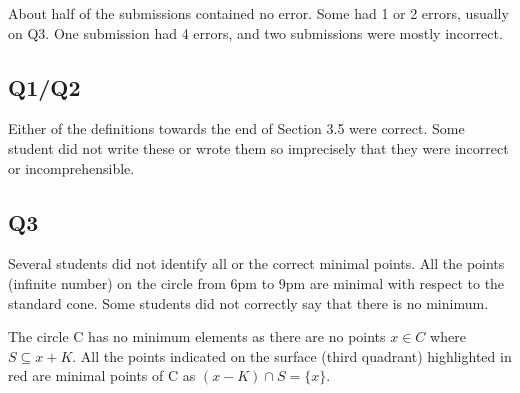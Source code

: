 About half of the submissions contained no error. Some had 1 or 2 errors, usually on Q3. One submission had 4 errors, and two submissions were mostly incorrect.

\subsection*{Q1/Q2} 

Either of the definitions towards the end of Section 3.5 were correct. Some student did not write these or wrote them so imprecisely that they were incorrect or incomprehensible.

\subsection*{Q3}

Several students did not identify all or the correct minimal points. All the points (infinite number) on the circle from 6pm to 9pm are minimal with respect to the standard cone. Some students did not correctly say that there is no minimum.

The circle C has no minimum elements as there are no points $x \in C$ where $S \subseteq x + K$.
All the points indicated on the surface (third quadrant) highlighted in red are minimal points of C
as $ (x - K) \cap S = \{x\}$.

\begin{center}
\end{center}